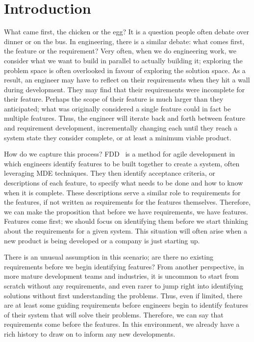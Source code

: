 \chapter{Introduction}
\label{chap:Introduction}

What came first, the chicken or the egg? It is a question people often debate over dinner or on the bus. In engineering, there is a similar debate: what comes first, the feature or the requirement? Very often, when we do engineering work, we consider what we want to build in parallel to actually building it; exploring the problem space is often overlooked in favour of exploring the solution space. As a result, an engineer may have to reflect on their requirements when they hit a wall during development. They may find that their requirements were incomplete for their feature. Perhaps the scope of their feature is much larger than they anticipated; what was originally considered a single feature could in fact be multiple features. Thus, the engineer will iterate back and forth between feature and requirement development, incrementally changing each until they reach a system state they consider complete, or at least a minimum viable product. 

How do we capture this process? \gls{FDD}~\cite{palmer2001practical} is a method for agile development in which engineers identify features to be built together to create a system, often leveraging \gls{MDE} techniques. They then identify acceptance criteria, or descriptions of each feature, to specify what needs to be done and how to know when it is complete. These descriptions serve a similar role to requirements for the features, if not written as requirements for the features themselves. Therefore, we can make the proposition that before we have requirements, we have features. Features come first; we should focus on identifying them before we start thinking about the requirements for a given system. This situation will often arise when a new product is being developed or a company is just starting up.

There is an unusual assumption in this scenario; are there no existing requirements before we begin identifying features? From another perspective, in more mature development teams and industries, it is uncommon to start from scratch without any requirements, and even rarer to jump right into identifying solutions without first understanding the problems. Thus, even if limited, there are at least some guiding requirements before engineers begin to identify features of their system that will solve their problems. Therefore, we can say that requirements come before the features. In this environment, we already have a rich history to draw on to inform any new developments.

